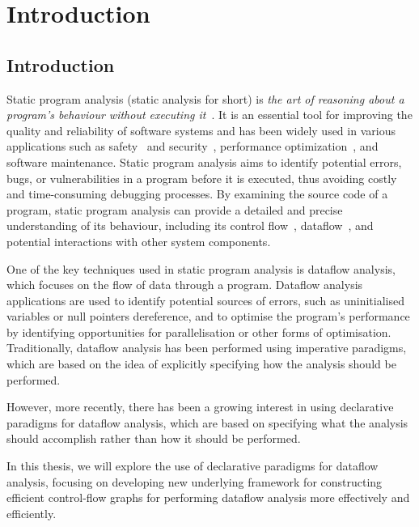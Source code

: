 \chapter{Introduction}
\section{Introduction}

Static program analysis (static analysis for short) is 
\emph{the art of reasoning about a program's behaviour without executing it}~\cite{spa}.
It is an essential tool for improving the quality and reliability of software
systems and has been widely used in various applications such
as safety~\cite{cousot2005astree,Blanchet2002} and security~\cite{piskachev2021secucheck,flowDroid,ayewah2008using,dura2021javadl,fink2012wala},
performance optimization~\cite{aho2007compilers,appel2004modern}, and software maintenance.
Static program analysis aims to identify potential errors, bugs, or vulnerabilities
in a program before it is executed, thus avoiding costly and time-consuming 
debugging processes. By examining the source code of a program, static program 
analysis can provide a detailed and precise understanding of its behaviour, including
its control flow~\cite{allen1970control}, dataflow~\cite{kam1977monotone}, and potential interactions with other system components.



One of the key techniques used in static program analysis is dataflow analysis,
which focuses on the flow of data through a program. Dataflow analysis applications are used to identify
potential sources of errors, such as uninitialised variables or null pointers dereference, 
and to optimise the program's performance by identifying opportunities for 
parallelisation or other forms of optimisation.
Traditionally, dataflow analysis has been performed using imperative paradigms, 
which are based on the idea of explicitly specifying how the analysis should be 
performed. 

However, more recently, there has been a growing interest in using 
declarative paradigms for dataflow analysis, which are based on specifying what 
the analysis should accomplish rather than how it should be performed.

In this thesis, we will explore the use of declarative paradigms for dataflow 
analysis, focusing on developing new underlying framework for constructing 
efficient control-flow graphs for performing dataflow 
analysis more effectively and efficiently.

